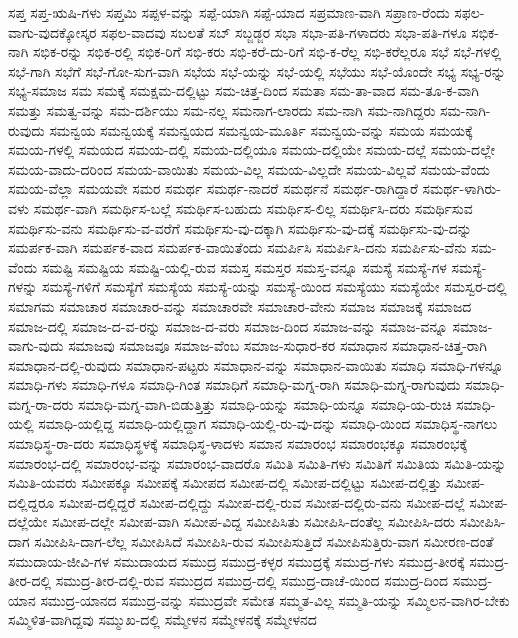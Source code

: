 {ಸಪ್ತ
ಸಪ್ತ-ಋಷಿ-ಗಳು
ಸಪ್ತಮಿ
ಸಪ್ಪಳ-ವನ್ನು
ಸಪ್ಪೆ-ಯಾಗಿ
ಸಪ್ಪೆ-ಯಾದ
ಸಪ್ರಮಾಣ-ವಾಗಿ
ಸಪ್ರಾಣ-ರೆಂದು
ಸಫಲ-ವಾಗು-ವುದಕ್ಕೋಸ್ಕರ
ಸಫಲ-ವಾದವು
ಸಬಲತೆ
ಸಬ್
ಸಬ್ಜಡ್ಜರ
ಸಭಾ
ಸಭಾ-ಪತಿ-ಗಳಾದರು
ಸಭಾ-ಪತಿ-ಗಳೂ
ಸಭಿಕ-ನಾಗಿ
ಸಭಿಕ-ರನ್ನು
ಸಭಿಕ-ರಲ್ಲಿ
ಸಭಿಕ-ರಿಗೆ
ಸಭಿ-ಕರು
ಸಭಿ-ಕರೆ-ದು-ರಿಗೆ
ಸಭಿ-ಕ-ರೆಲ್ಲ
ಸಭಿ-ಕರೆಲ್ಲರೂ
ಸಭೆ
ಸಭೆ-ಗಳಲ್ಲಿ
ಸಭೆ-ಗಾಗಿ
ಸಭೆಗೆ
ಸಭೆ-ಗೋ-ಸುಗ-ವಾಗಿ
ಸಭೆಯ
ಸಭೆ-ಯನ್ನು
ಸಭೆ-ಯಲ್ಲಿ
ಸಭೆಯು
ಸಭೆ-ಯೊಂದೇ
ಸಭ್ಯ
ಸಭ್ಯ-ರನ್ನು
ಸಭ್ಯ-ಸಮಾಜ
ಸಮ
ಸಮಕ್ಕೆ
ಸಮಕ್ಷಮ-ದಲ್ಲಿಟ್ಟು
ಸಮ-ಚಿತ್ತ-ದಿಂದ
ಸಮತಾ
ಸಮ-ತಾ-ವಾದ
ಸಮ-ತೂ-ಕ-ವಾಗಿ
ಸಮತ್ತು
ಸಮತ್ವ-ವನ್ನು
ಸಮ-ದರ್ಶಿಯು
ಸಮ-ನಲ್ಲ
ಸಮನಾಗ-ಲಾರದು
ಸಮ-ನಾಗಿ
ಸಮ-ನಾಗಿದ್ದರು
ಸಮ-ನಾಗಿ-ರುವುದು
ಸಮನ್ವಯ
ಸಮನ್ವಯಕ್ಕೆ
ಸಮನ್ವಯದ
ಸಮನ್ವಯ-ಮೂರ್ತಿ
ಸಮನ್ವಯ-ವನ್ನು
ಸಮಯ
ಸಮಯಕ್ಕೆ
ಸಮಯ-ಗಳಲ್ಲಿ
ಸಮಯದ
ಸಮಯ-ದಲ್ಲಿ
ಸಮಯ-ದಲ್ಲಿಯೂ
ಸಮಯ-ದಲ್ಲಿಯೇ
ಸಮಯ-ದಲ್ಲೆ
ಸಮಯ-ದಲ್ಲೇ
ಸಮಯ-ವಾದು-ದರಿಂದ
ಸಮಯ-ವಾಯಿತು
ಸಮಯ-ವಿಲ್ಲ
ಸಮಯ-ವಿಲ್ಲದೇ
ಸಮಯ-ವಿಲ್ಲವೆ
ಸಮಯ-ವೆಂದು
ಸಮಯ-ವೆಲ್ಲಾ
ಸಮಯವೇ
ಸಮರ
ಸಮರ್ಥ
ಸಮರ್ಥ-ನಾದರೆ
ಸಮರ್ಥನೆ
ಸಮರ್ಥ-ರಾಗಿದ್ದಾರೆ
ಸಮರ್ಥ-ಳಾಗಿರು-ವಳು
ಸಮರ್ಥ-ವಾಗಿ
ಸಮರ್ಥಿಸ-ಬಲ್ಲೆ
ಸಮರ್ಥಿಸ-ಬಹುದು
ಸಮರ್ಥಿಸ-ಲಿಲ್ಲ
ಸಮರ್ಥಿಸಿ-ದರು
ಸಮರ್ಥಿಸುವ
ಸಮರ್ಥಿಸು-ವನು
ಸಮರ್ಥಿಸು-ವ-ವರೆಗೆ
ಸಮರ್ಥಿಸು-ವು-ದಕ್ಕಾಗಿ
ಸಮರ್ಥಿಸು-ವು-ದಕ್ಕೆ
ಸಮರ್ಥಿಸು-ವು-ದನ್ನು
ಸಮರ್ಪಕ-ವಾಗಿ
ಸಮರ್ಪಕ-ವಾದ
ಸಮರ್ಪಕ-ವಾಯಿತೆಂದು
ಸಮರ್ಪಿಸಿ
ಸಮರ್ಪಿಸಿ-ದನು
ಸಮರ್ಪಿಸು-ವೆನು
ಸಮ-ವೆಂದು
ಸಮಷ್ಟಿ
ಸಮಷ್ಟಿಯ
ಸಮಷ್ಟಿ-ಯಲ್ಲಿ-ರುವ
ಸಮಸ್ತ
ಸಮಸ್ತರ
ಸಮಸ್ತ-ವನ್ನೂ
ಸಮಸ್ಯೆ
ಸಮಸ್ಯೆ-ಗಳ
ಸಮಸ್ಯೆ-ಗಳನ್ನು
ಸಮಸ್ಯೆ-ಗಳಿಗೆ
ಸಮಸ್ಯೆಗೆ
ಸಮಸ್ಯೆಯ
ಸಮಸ್ಯೆ-ಯನ್ನು
ಸಮಸ್ಯೆ-ಯಿಂದ
ಸಮಸ್ಯೆಯು
ಸಮಸ್ಯೆಯೇ
ಸಮಸ್ವರ-ದಲ್ಲಿ
ಸಮಾಗಮ
ಸಮಾಚಾರ
ಸಮಾಚಾರ-ವನ್ನು
ಸಮಾಚಾರವೇ
ಸಮಾಚಾರ-ವೇನು
ಸಮಾಜ
ಸಮಾಜಕ್ಕೆ
ಸಮಾಜದ
ಸಮಾಜ-ದಲ್ಲಿ
ಸಮಾಜ-ದ-ವ-ರನ್ನು
ಸಮಾಜ-ದ-ವರು
ಸಮಾಜ-ದಿಂದ
ಸಮಾಜ-ವನ್ನು
ಸಮಾಜ-ವನ್ನೂ
ಸಮಾಜ-ವಾಗು-ವುದು
ಸಮಾಜವು
ಸಮಾಜವೂ
ಸಮಾಜ-ವೆಂಬ
ಸಮಾಜ-ಸುಧಾರ-ಕರ
ಸಮಾಧಾನ
ಸಮಾಧಾನ-ಚಿತ್ತ-ರಾಗಿ
ಸಮಾಧಾನ-ದಲ್ಲಿ-ರುವುದು
ಸಮಾಧಾನ-ಪಟ್ಟರು
ಸಮಾಧಾನ-ವನ್ನು
ಸಮಾಧಾನ-ವಾಯಿತು
ಸಮಾಧಿ
ಸಮಾಧಿ-ಗಳನ್ನೂ
ಸಮಾಧಿ-ಗಳು
ಸಮಾಧಿ-ಗಳೂ
ಸಮಾಧಿ-ಗಿಂತ
ಸಮಾಧಿಗೆ
ಸಮಾಧಿ-ಮಗ್ನ-ರಾಗಿ
ಸಮಾಧಿ-ಮಗ್ನ-ರಾಗುವುದು
ಸಮಾಧಿ-ಮಗ್ನ-ರಾ-ದರು
ಸಮಾಧಿ-ಮಗ್ನ-ವಾಗಿ-ಬಿಡುತ್ತಿತ್ತು
ಸಮಾಧಿ-ಯನ್ನು
ಸಮಾಧಿ-ಯನ್ನೂ
ಸಮಾಧಿ-ಯ-ರುಚಿ
ಸಮಾಧಿ-ಯಲ್ಲಿ
ಸಮಾಧಿ-ಯಲ್ಲಿದ್ದ
ಸಮಾಧಿ-ಯಲ್ಲಿದ್ದಾಗ
ಸಮಾಧಿ-ಯಲ್ಲಿ-ರು-ವು-ದನ್ನು
ಸಮಾಧಿ-ಯಿಂದ
ಸಮಾಧಿಸ್ಥ-ನಾಗಲು
ಸಮಾಧಿಸ್ಥ-ರಾ-ದರು
ಸಮಾಧಿಸ್ಥಳಕ್ಕೆ
ಸಮಾಧಿಸ್ಥ-ಳಾದಳು
ಸಮಾನ
ಸಮಾರಂಭ
ಸಮಾರಂಭಕ್ಕೂ
ಸಮಾರಂಭಕ್ಕೆ
ಸಮಾರಂಭ-ದಲ್ಲಿ
ಸಮಾರಂಭ-ವನ್ನು
ಸಮಾರಂಭ-ವಾದರೊ
ಸಮಿತಿ
ಸಮಿತಿ-ಗಳು
ಸಮಿತಿಗೆ
ಸಮಿತಿಯ
ಸಮಿತಿ-ಯನ್ನು
ಸಮಿತಿ-ಯವರು
ಸಮೀಪಕ್ಕೂ
ಸಮೀಪಕ್ಕೆ
ಸಮೀಪದ
ಸಮೀಪ-ದಲ್ಲಿ
ಸಮೀಪ-ದಲ್ಲಿಟ್ಟು
ಸಮೀಪ-ದಲ್ಲಿತ್ತು
ಸಮೀಪ-ದಲ್ಲಿದ್ದರೂ
ಸಮೀಪ-ದಲ್ಲಿದ್ದರೆ
ಸಮೀಪ-ದಲ್ಲಿದ್ದು
ಸಮೀಪ-ದಲ್ಲಿ-ರುವ
ಸಮೀಪ-ದಲ್ಲಿರು-ವನು
ಸಮೀಪ-ದಲ್ಲೆ
ಸಮೀಪ-ದಲ್ಲೆಯೇ
ಸಮೀಪ-ದಲ್ಲೇ
ಸಮೀಪ-ವಾಗಿ
ಸಮೀಪ-ವಿದ್ದ
ಸಮೀಪಿಸಿತು
ಸಮೀಪಿಸಿ-ದಂತೆಲ್ಲ
ಸಮೀಪಿಸಿ-ದರು
ಸಮೀಪಿಸಿ-ದಾಗ
ಸಮೀಪಿಸಿ-ದಾಗ-ಲೆಲ್ಲ
ಸಮೀಪಿಸಿದೆ
ಸಮೀಪಿಸಿ-ರುವ
ಸಮೀಪಿಸುತ್ತಿದೆ
ಸಮೀಪಿಸುತ್ತಿರು-ವಾಗ
ಸಮೀರಣ-ದಂತೆ
ಸಮುದಾಯ-ಜೀವಿ-ಗಳ
ಸಮುದಾಯದ
ಸಮುದ್ರ
ಸಮುದ್ರ-ಕಳ್ಳರ
ಸಮುದ್ರಕ್ಕೆ
ಸಮುದ್ರ-ಗಳು
ಸಮುದ್ರ-ತೀರಕ್ಕೆ
ಸಮುದ್ರ-ತೀರ-ದಲ್ಲಿ
ಸಮುದ್ರ-ತೀರ-ದಲ್ಲಿ-ರುವ
ಸಮುದ್ರದ
ಸಮುದ್ರ-ದಲ್ಲಿ
ಸಮುದ್ರ-ದಾಚೆ-ಯಿಂದ
ಸಮುದ್ರ-ದಿಂದ
ಸಮುದ್ರ-ಯಾನ
ಸಮುದ್ರ-ಯಾನದ
ಸಮುದ್ರ-ವನ್ನು
ಸಮುದ್ರವೇ
ಸಮೇತ
ಸಮ್ಮತ-ವಿಲ್ಲ
ಸಮ್ಮತಿ-ಯನ್ನು
ಸಮ್ಮಿಲನ-ವಾಗಿರ-ಬೇಕು
ಸಮ್ಮಿಳಿತ-ವಾಗಿದ್ದವು
ಸಮ್ಮುಖ-ದಲ್ಲಿ
ಸಮ್ಮೇಳನ
ಸಮ್ಮೇಳನಕ್ಕೆ
ಸಮ್ಮೇಳನದ
}
